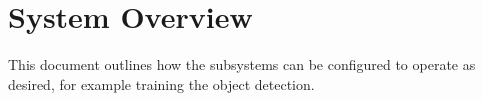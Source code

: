 \chapter{System Overview}

This document outlines how the subsystems can be configured to operate as desired, for example training the object detection.